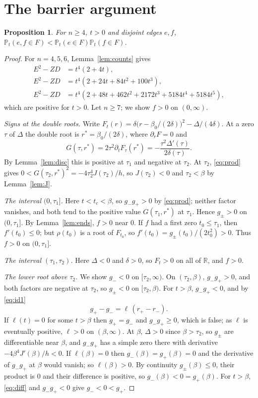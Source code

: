 \documentclass[11pt]{amsart}
\newtheorem{proposition}[theorem]{Proposition}
\theoremstyle{remark}
\newcommand{\Pt}{\mathbb{P}_t}
\newcommand{\Dscr}{\Delta}
\begin{document}
\section{The barrier argument}\label{sec:barrier}

\begin{proposition}\label{prop:dis}
For $n\ge4$, $t>0$ and disjoint edges $e,f$, $\Pt(e,f\in F)<\Pt(e\in F)\Pt(f\in F)$.
\end{proposition}

\begin{proof}
For $n=4,5,6$, Lemma~\ref{lem:counts} gives
\begin{align*}
E^2-ZD&=t^4(2+4t),\\
E^2-ZD&=t^4(2+24t+84t^2+100t^3),\\
E^2-ZD&=t^4(2+48t+462t^2+2172t^3+5184t^4+5184t^5),
\end{align*}
which are positive for $t>0$. Let $n\ge7$; we show $f>0$ on $(0,\infty)$.

\emph{Signs at the double roots.} Write
$F_t(r)=\delta\bigl(r-\beta_0/(2\delta)\bigr)^2-\Dscr/(4\delta)$. At a zero $\tau$ of
$\Dscr$ the double root is $r^*=\beta_0/(2\delta)$, where $\partial_rF=0$ and
\[
G(\tau,r^*)=2\tau^2\partial_tF_\tau(r^*)=-\frac{\tau^2\Dscr'(\tau)}{2\delta(\tau)} .
\]
By Lemma~\ref{lem:disc} this is positive at $\tau_1$ and negative at $\tau_2$. At
$\tau_2$, \eqref{eq:prod} gives $0<G(\tau_2,r^*)^2=-4\tau_2^4J(\tau_2)/h$, so
$J(\tau_2)<0$ and $\tau_2<\beta$ by Lemma~\ref{lem:J}.

\emph{The interval $(0,\tau_1]$.} Here $t<t_c<\beta$, so $g_-g_+>0$ by \eqref{eq:prod};
neither factor vanishes, and both tend to the positive value $G(\tau_1,r^*)$ at
$\tau_1$. Hence $g_\pm>0$ on $(0,\tau_1]$. By Lemma~\ref{lem:ends}, $f>0$ near $0$. If
$f$ had a first zero $t_0\le\tau_1$, then $f'(t_0)\le0$; but $\rho(t_0)$ is a root of
$F_{t_0}$, so $f'(t_0)=g_\pm(t_0)/(2t_0^2)>0$. Thus $f>0$ on $(0,\tau_1]$.

\emph{The interval $(\tau_1,\tau_2)$.} Here $\Dscr<0$ and $\delta>0$, so $F_t>0$ on all
of $\mathbb R$, and $f>0$.

\emph{The lower root above $\tau_2$.} We show $g_-<0$ on $[\tau_2,\infty)$. On
$(\tau_2,\beta)$, $g_-g_+>0$, and both factors are negative at $\tau_2$, so
$g_\pm<0$ on $[\tau_2,\beta)$. For $t>\beta$, $g_-g_+<0$, and by \eqref{eq:id1}
\begin{equation}\label{eq:diff}
g_+-g_-=\ell\,(r_+-r_-).
\end{equation}
If $\ell(t)=0$ for some $t>\beta$ then $g_+=g_-$ and $g_-g_+\ge0$, which is false; as
$\ell$ is eventually positive, $\ell>0$ on $(\beta,\infty)$. At $\beta$, $\Dscr>0$ since
$\beta>\tau_2$, so $g_\pm$ are differentiable near $\beta$, and $g_-g_+$ has a simple
zero there with derivative $-4\beta^4J'(\beta)/h<0$. If $\ell(\beta)=0$ then
$g_-(\beta)=g_+(\beta)=0$ and the derivative of $g_-g_+$ at $\beta$ would vanish; so
$\ell(\beta)>0$. By continuity $g_\pm(\beta)\le0$, their product is $0$ and their
difference is positive, so $g_-(\beta)<0=g_+(\beta)$. For $t>\beta$, \eqref{eq:diff}
and $g_-g_+<0$ give $g_-<0<g_+$.


\end{proof}
\end{document}
